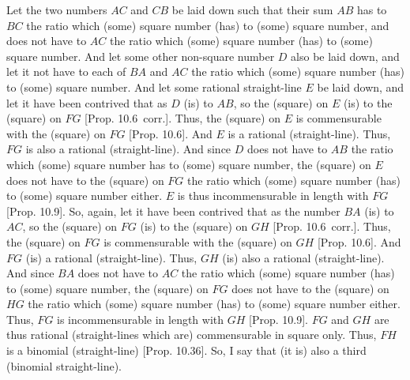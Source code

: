 \begin{Parallel}{}{}
{Let the two numbers $AC$ and $CB$ be laid down such that their sum
$AB$ has to $BC$ the ratio which (some) square number (has) to
(some) square number, and does not have to $AC$ the ratio which (some)
square number (has) to (some) square number. And let some other non-square number
$D$ also be laid down, and let it not have to each of $BA$ and $AC$ the
ratio which (some) square number (has) to (some) square number.
And let some rational straight-line $E$ be laid down, and let it have been
contrived that as $D$ (is) to $AB$, so the (square) on $E$ (is) to
the (square) on $FG$ [Prop. 10.6~corr.]. Thus,
the (square) on $E$ is commensurable with the (square) on $FG$ [Prop. 10.6]. And $E$ is a rational (straight-line).
Thus, $FG$ is also a rational (straight-line). And since $D$ does not have to
$AB$ the ratio which (some) square number has to (some) square number,
the (square) on $E$ does not have to the (square) on $FG$ the ratio
which (some) square number (has) to (some) square number either.
$E$ is thus incommensurable in length with $FG$ [Prop. 10.9]. So, again, let it have been contrived that
as the number $BA$ (is) to $AC$, so the (square) on  $FG$ (is) to the
(square) on $GH$ [Prop. 10.6~corr.]. Thus,
the (square) on $FG$ is commensurable with the (square) on $GH$
[Prop. 10.6]. And $FG$ (is) a rational (straight-line).
Thus, $GH$ (is) also a rational (straight-line). And since $BA$ does not have to $AC$ the ratio which (some) square number (has) to (some) square number, the (square) on $FG$  does not have to the (square) on $HG$
the ratio which (some) square number (has) to (some) square number either.
Thus, $FG$ is incommensurable in length with $GH$ [Prop. 10.9].  $FG$ and $GH$ are thus rational
(straight-lines which are) commensurable in square only. Thus,
$FH$ is a binomial (straight-line) [Prop. 10.36].
So, I say that (it is) also a third (binomial straight-line).

}
\end{Parallel}
